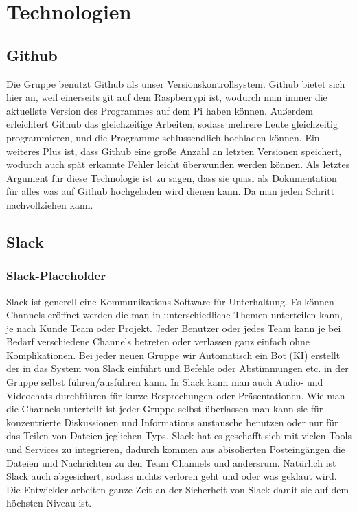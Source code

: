 \documentclass[notitlepage]{report}
\begin{document}
\section{Technologien}

\subsection{Github}

Die Gruppe benutzt Github als unser Versionskontrollsystem. Github bietet sich hier an, weil einerseits git auf dem Raspberrypi ist, wodurch man immer die aktuellste Version des Programmes auf dem Pi haben k\"{o}nnen. Au{\ss}erdem erleichtert Github das gleichzeitige Arbeiten, sodass mehrere Leute gleichzeitig programmieren, und die Programme schlussendlich hochladen k\"{o}nnen. Ein weiteres Plus ist, dass Github eine gro{\ss}e Anzahl an letzten Versionen speichert, wodurch auch sp\"{a}t erkannte Fehler leicht \"{u}berwunden werden k\"{o}nnen. Als letztes Argument f\"{u}r diese Technologie ist zu sagen, dass sie quasi als Dokumentation f\"{u}r alles was auf Github hochgeladen wird dienen kann. Da man jeden Schritt nachvollziehen kann. 

\subsection{Slack}

\subsubsection{Slack-Placeholder}

Slack ist generell eine Kommunikations Software f\"{u}r Unterhaltung. Es k\"{o}nnen Channels er\"{o}ffnet werden die man in unterschiedliche Themen unterteilen kann, je nach Kunde Team oder Projekt. Jeder Benutzer oder jedes Team kann je bei Bedarf verschiedene Channels betreten oder verlassen ganz einfach ohne Komplikationen. Bei jeder neuen Gruppe wir Automatisch ein Bot (KI) erstellt der in das System von Slack einf\"{u}hrt und Befehle oder Abstimmungen etc. in der Gruppe selbst f\"{u}hren/ausf\"{u}hren kann. In Slack kann man auch Audio- und Videochats durchf\"{u}hren f\"{u}r kurze Besprechungen oder Pr\"{a}sentationen.  Wie man die Channels unterteilt ist jeder Gruppe selbst \"{u}berlassen man kann sie f\"{u}r konzentrierte Diskussionen und Informations austausche benutzen oder nur f\"{u}r das Teilen von Dateien jeglichen Typs. Slack hat es geschafft sich mit vielen Tools und Services zu integrieren, dadurch kommen aus abisolierten Posteing\"{a}ngen die Dateien und Nachrichten zu den Team Channels und andersrum. Nat\"{u}rlich ist Slack auch abgesichert, sodass nichts verloren geht und oder was geklaut wird. Die Entwickler arbeiten ganze Zeit an der Sicherheit von Slack damit sie auf dem h\"{o}chsten Niveau ist.
\end{document}
